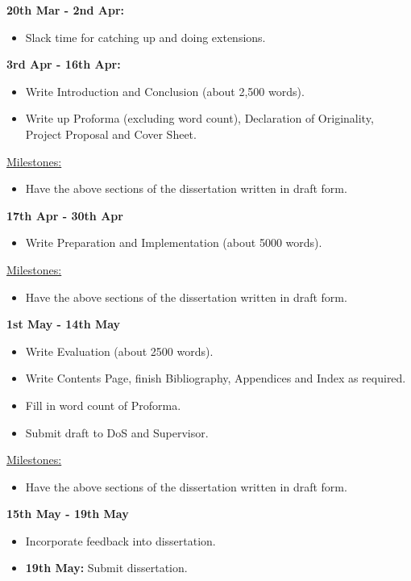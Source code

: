 \documentclass[12pt,a4paper,twoside]{article}
\begin{document}
\textbf{20th Mar - 2nd Apr:}
\begin{itemize}
\item{Slack time for catching up and doing extensions.}
\end{itemize}

\textbf{3rd Apr - 16th Apr:}
\begin{itemize}
\item{Write Introduction and Conclusion (about 2,500 words).}
\item{Write up Proforma (excluding word count), Declaration of Originality, Project Proposal and Cover Sheet.}
\end{itemize}
\underline{Milestones:}
\begin{itemize}
\item{Have the above sections of the dissertation written in draft form.}
\end{itemize}


\textbf{17th Apr - 30th Apr}
\begin{itemize}
\item{Write Preparation and Implementation (about 5000 words).}
\end{itemize}
\underline{Milestones:}
\begin{itemize}
\item{Have the above sections of the dissertation written in draft form.}
\end{itemize}

\textbf{1st May - 14th May}
\begin{itemize}
\item{Write Evaluation (about 2500 words).}
\item{Write Contents Page, finish Bibliography, Appendices and Index as required.}
\item{Fill in word count of Proforma.}
\item{Submit draft to DoS and Supervisor.}
\end{itemize}
\underline{Milestones:}
\begin{itemize}
\item{Have the above sections of the dissertation written in draft form.}
\end{itemize}

\textbf{15th May - 19th May}
\begin{itemize}
\item{Incorporate feedback into dissertation.}
\item{\textbf{19th May:} Submit dissertation.}
\end{itemize}
\end{document}
